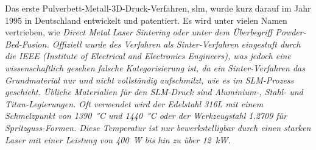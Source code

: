 \documentclass[../main.tex]{subfiles}
\begin{document}
Das erste Pulverbett-Metall-3D-Druck-Verfahren, \acrfull{slm}, wurde kurz darauf im Jahr 1995 in Deutschland entwickelt und patentiert. Es wird unter vielen Namen vertrieben, wie \it{Direct Metal Laser Sintering} oder unter dem Überbegriff \it{Powder-Bed-Fusion}. Offiziell wurde des Verfahren als Sinter-Verfahren eingestuft durch die IEEE (\it{Institute of Electrical and Electronics Engineers}), was jedoch eine wissenschaftlich gesehen falsche Kategorisierung ist, da ein Sinter-Verfahren das Grundmaterial nur  und nicht vollständig aufschmilzt, wie es im SLM-Prozess geschieht. \parencite{SINTER_SMELT} Übliche Materialien für den SLM-Druck sind Aluminium-, Stahl- und Titan-Legierungen. Oft verwendet wird der Edelstahl 316L mit einem Schmelzpunkt von \qty{1390}{\celsius} und \qty{1440}{\degreeCelsius} \parencite{610LSTEEL} oder der Werkzeugstahl 1.2709 für Spritzguss-Formen. \parencite{steel12709} Diese Temperatur ist nur bewerkstelligbar durch einen starken Laser mit einer Leistung von \qty{400}{\watt} bis hin zu über \qty{12}{\kilo\watt}.
\end{document}
